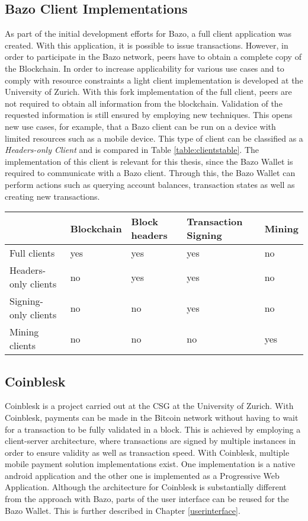 \subsection{Bazo Client Implementations}
As part of the initial development efforts for Bazo, a full client application was created. With this application, it is possible to issue transactions. However, in order to participate in the Bazo network, peers have to obtain a complete copy of the Blockchain. In order to increase applicability for various use cases and to comply with resource constraints a light client implementation is developed at the University of Zurich. With this fork implementation of the full client, peers are not required to obtain all information from the blockchain. Validation of the requested information is still ensured by employing new techniques. This opens new use cases, for example, that a Bazo client can be run on a device with limited resources such as a mobile device. This type of client can be classified as a \textit{Headers-only Client} \cite{bitcoinclients} and is compared in Table \ref{table:clientstable}.
The implementation of this client is relevant for this thesis, since the Bazo Wallet is required to communicate with a Bazo client. Through this, the Bazo Wallet can perform actions such as querying account balances, transaction states as well as creating new transactions.

\begin{center}\label{table:clientstable}
    \begin{tabular}{ | l | l | l | l | p{3cm} |}
    \hline
      & Blockchain & Block headers & Transaction Signing & Mining \\ \hline
    Full clients  & yes & yes & yes & no \\ \hline
    Headers-only clients  & no & yes & yes & no \\ \hline    
    Signing-only clients  & no & no & yes & no \\ \hline
    Mining clients  & no & no & no & yes \\ \hline
    \end{tabular}

\end{center}
\subsection{Coinblesk}
Coinblesk is a project carried out at the CSG at the University of Zurich. With Coinblesk, payments can be made in the Bitcoin network without having to wait for a transaction to be fully validated in a block. This is achieved by employing a client-server architecture, where transactions are signed by multiple instances in order to ensure validity as well as transaction speed.
With Coinblesk, multiple mobile payment solution implementations exist. One implementation is a native android application and the other one is implemented as a Progressive Web Application. Although the architecture for Coinblesk is substantially different from the approach with Bazo, parts of the user interface can be reused for the Bazo Wallet. This is further described in Chapter \ref{userinterface}.
